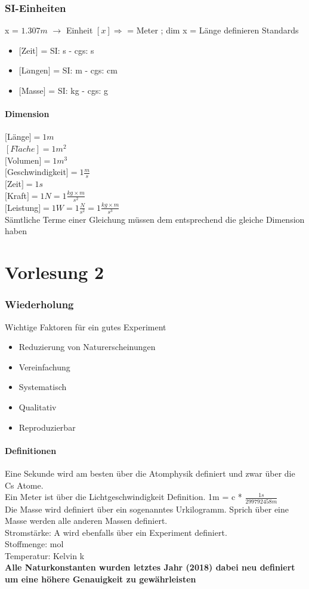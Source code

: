 \documentclass[11pt]{article}
\begin{document}
	\section{SI-Einheiten}
	x = $1.307 m$ $\rightarrow$ Einheit $[x] \Rightarrow$ = Meter ; dim x = Länge definieren Standards
	\begin{itemize}
		\item $[$Zeit$]$ = SI: s - cgs: s
		\item $[$L$\ddot{a}$ngen$]$ = SI: m - cgs: cm
		\item $[$Masse$]$ = SI: kg - cgs: g
	\end{itemize}
	\subsection{Dimension}
	$[$Länge$] = 1m$\\
	$[Fl\ddot{a}che] = 1m^2$\\
	$[$Volumen$] = 1m^3$\\
	$[$Geschwindigkeit$] = 1\frac{m}{s}$\\
	$[$Zeit$] = 1s$\\
	$[$Kraft$] = 1N = 1\frac{kg\times m}{s^2}$\\
	$[$Leistung$] = 1W = 1\frac{N}{s^2} = 1\frac{kg\times m}{s^3}$\\
	Sämtliche Terme einer Gleichung müssen dem entsprechend die gleiche Dimension haben
	\part{Vorlesung 2}
	\section{Wiederholung}
	Wichtige Faktoren für ein gutes Experiment
	\begin{itemize}
		\item Reduzierung von Naturerscheinungen
		\item Vereinfachung
		\item Systematisch
		\item Qualitativ
		\item Reproduzierbar
	\end{itemize}
	\subsection{Definitionen}
	Eine Sekunde wird am besten über die Atomphysik definiert und zwar über die Cs Atome.\\
	Ein Meter ist über die Lichtgeschwindigkeit Definition. 1m = c * $\frac{1s}{299792458 m}$\\
	Die Masse wird definiert über ein sogenanntes Urkilogramm. Sprich über eine Masse werden alle anderen Massen definiert.\\
	Stromstärke: A wird ebenfalls über ein Experiment definiert.\\
	Stoffmenge: mol\\
	Temperatur: Kelvin \quad k\\
	\textbf{Alle Naturkonstanten wurden letztes Jahr (2018) dabei neu definiert um eine höhere Genauigkeit zu gewährleisten}
\end{document}
